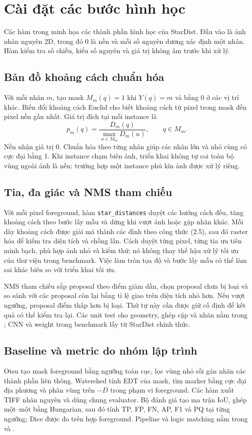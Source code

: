 \documentclass[12pt,a4paper]{report}
\begin{document}
\clearpage
\section{Cài đặt các bước hình học}
Các hàm trong  minh họa các thành phần
hình học của StarDist. Đầu vào là ảnh nhãn nguyên 2D, trong đó 0 là nền và
mỗi số nguyên dương xác định một nhân. Hàm kiểm tra số chiều, kiểu số nguyên
và giá trị không âm trước khi xử lý.

\subsection{Bản đồ khoảng cách chuẩn hóa}
Với mỗi nhãn $m$, tạo mask $M_m(q)=1$ khi $Y(q)=m$ và bằng 0 ở các vị trí
khác. Biến đổi khoảng cách Euclid cho biết khoảng cách từ pixel trong mask
đến pixel nền gần nhất. Giá trị đích tại mỗi instance là
\begin{equation}
p_m(q)=\frac{D_m(q)}{\max_{u\in M_m} D_m(u)},\qquad q\in M_m.
\end{equation}
Nền nhận giá trị 0. Chuẩn hóa theo từng nhân giúp các nhân lớn và nhỏ cùng có
cực đại bằng 1. Khi instance chạm biên ảnh, triển khai không tự coi toàn bộ
vùng ngoài ảnh là nền; trường hợp một instance phủ kín ảnh được xử lý riêng.

\subsection{Tia, đa giác và NMS tham chiếu}
Với mỗi pixel foreground, hàm \texttt{star\_distances} duyệt các hướng cách đều,
tăng khoảng cách theo bước lấy mẫu và dừng khi vượt ảnh hoặc gặp nhãn khác.
Mỗi dãy khoảng cách được giải mã thành các đỉnh theo công thức (2.5), sau đó
raster hóa để kiểm tra diện tích và chồng lấn. Cách duyệt từng pixel, từng tia
ưu tiên minh bạch, phù hợp ảnh nhỏ và kiểm thử; nó không thay thế hậu xử lý tối
ưu của thư viện trong benchmark. Việc làm tròn tọa độ và bước lấy mẫu có thể
làm sai khác biên so với triển khai tối ưu.

NMS tham chiếu sắp proposal theo điểm giảm dần, chọn proposal chưa bị loại và
so sánh với các proposal còn lại bằng tỉ lệ giao trên diện tích nhỏ hơn. Nếu
vượt ngưỡng, proposal điểm thấp hơn bị loại. Thứ tự này cần được giữ cố định
để kết quả có thể kiểm tra lại. Các unit test cho geometry, ghép cặp và nhãn
nằm trong ; CNN và weight trong benchmark lấy từ StarDist chính thức.

\subsection{Baseline và metric do nhóm lập trình}
Otsu tạo mask foreground bằng ngưỡng toàn cục, lọc vùng nhỏ rồi gán nhãn các
thành phần liên thông. Watershed tính EDT của mask, tìm marker bằng cực đại địa
phương và phân vùng trên $-D$ trong phạm vi foreground. Các hàm xuất TIFF nhãn
nguyên và dùng chung evaluator. Bộ đánh giá tạo ma trận IoU, ghép một--một bằng
Hungarian, sau đó tính TP, FP, FN, AP, F1 và PQ tại từng ngưỡng; Dice được
đo trên hợp foreground. Pipeline và logic matching nằm trong
 và .
\end{document}
